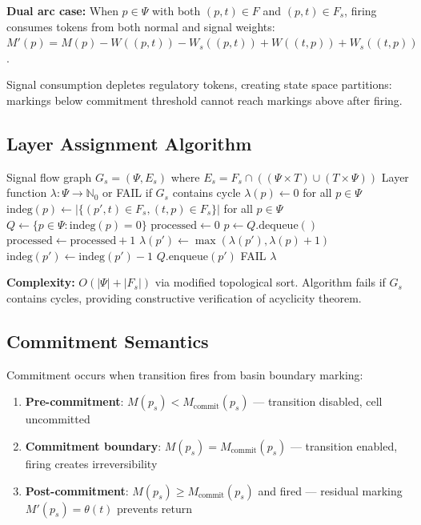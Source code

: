 \documentclass[10pt,letterpaper]{article}
\begin{document}
\textbf{Dual arc case:} When $p \in \Psi$ with both $(p,t) \in F$ and $(p,t) \in F_s$, firing consumes tokens from both normal and signal weights: $M'(p) = M(p) - W((p,t)) - W_s((p,t)) + W((t,p)) + W_s((t,p))$.

Signal consumption depletes regulatory tokens, creating state space partitions: markings below commitment threshold cannot reach markings above after firing.

\subsection{Layer Assignment Algorithm}

\begin{algorithm}
\caption{Hierarchical Layer Assignment}
\begin{algorithmic}[1]
\Require Signal flow graph $G_s = (\Psi, E_s)$ where $E_s = F_s \cap ((\Psi \times T) \cup (T \times \Psi))$
\Ensure Layer function $\lambda: \Psi \rightarrow \mathbb{N}_0$ or FAIL if $G_s$ contains cycle
\State $\lambda(p) \leftarrow 0$ for all $p \in \Psi$
\State $\text{indeg}(p) \leftarrow |\{(p',t) \in F_s, (t,p) \in F_s\}|$ for all $p \in \Psi$ 
\State $Q \leftarrow \{p \in \Psi : \text{indeg}(p) = 0\}$ 
\State $\text{processed} \leftarrow 0$
    \State $p \leftarrow Q.\text{dequeue}()$
    \State $\text{processed} \leftarrow \text{processed} + 1$
     
        \State $\lambda(p') \leftarrow \max(\lambda(p'), \lambda(p) + 1)$
        \State $\text{indeg}(p') \leftarrow \text{indeg}(p') - 1$
            \State $Q.\text{enqueue}(p')$
        \EndIf
    \EndFor
\EndWhile
{}
    \State \Return FAIL 
\Else
    \State \Return $\lambda$
\EndIf
\end{algorithmic}
\end{algorithm}

\textbf{Complexity:} $O(|\Psi| + |F_s|)$ via modified topological sort. Algorithm fails if $G_s$ contains cycles, providing constructive verification of acyclicity theorem.

\subsection{Commitment Semantics}

Commitment occurs when transition fires from basin boundary marking:
\begin{enumerate}
\item \textbf{Pre-commitment}: $M(p_s) < M_{\text{commit}}(p_s)$ --- transition disabled, cell uncommitted
\item \textbf{Commitment boundary}: $M(p_s) = M_{\text{commit}}(p_s)$ --- transition enabled, firing creates irreversibility
\item \textbf{Post-commitment}: $M(p_s) \geq M_{\text{commit}}(p_s)$ and fired --- residual marking $M'(p_s) = \theta(t)$ prevents return
\end{enumerate}
\end{document}
